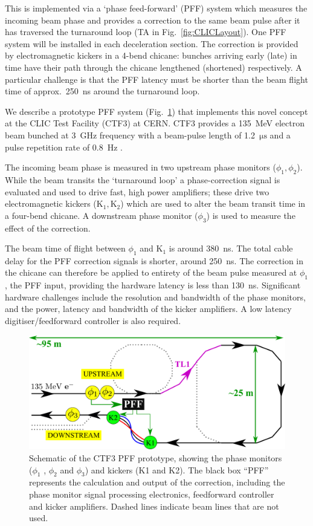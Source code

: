 \documentclass[%
 reprint,
 superscriptaddress,
 amsmath,
 amssymb,
 prl,
]{revtex4-1}
\begin{document}
This is implemented via a `phase feed-forward' (PFF) system which measures the 
incoming beam phase and provides a correction to the same beam pulse 
after it has traversed the turnaround loop (TA in Fig.~\ref{fig:CLICLayout}). 
One PFF system will be installed in each deceleration section. The correction 
is provided by electromagnetic kickers in a 4-bend chicane: bunches arriving 
early (late) in time have their path through the chicane lengthened (shortened) 
respectively. A particular challenge is that the PFF latency must be shorter 
than the beam flight time of approx.~250~ns around the turnaround loop.

We describe a prototype PFF system (Fig.~\ref{fig:pffLayout}) that implements 
this novel concept at the CLIC Test Facility (CTF3) at CERN. CTF3 provides a 
135~MeV electron beam bunched at 3~GHz frequency with a beam-pulse length of 
1.2~\(\mathrm{\mu s}\) and a pulse repetition rate of 0.8~Hz \cite{CLICCDR}. 

The incoming beam phase is measured in two upstream phase 
monitors (\(\phi_{1}, \phi_{2}\)). While the beam 
transits the ‘turnaround loop’ a phase-correction signal is evaluated and used 
to drive fast, high power amplifiers; these drive two electromagnetic kickers 
(\(\mathrm{K_1, K_2}\)) which are used to alter the beam transit time in a 
four-bend chicane. A downstream phase monitor (\(\phi_{3}\)) is 
used to measure the effect of the correction. 

The beam time of flight between \(\phi_1\) and \(\mathrm{K_1}\) is around 
380~ns. The total cable delay for the PFF correction signals 
is shorter, around 250~ns. The correction in the chicane can therefore be 
applied to entirety of the beam pulse measured at \(\phi_1\), the PFF input, 
providing the hardware latency is less than 130~ns. Significant hardware 
challenges include the resolution and bandwidth of the phase monitors, and the 
power, latency and bandwidth of the kicker amplifiers. A low latency 
digitiser/feedforward controller is also required.
 
\begin{figure}
	\includegraphics[width=\columnwidth]{figs/ctfpffLayout}%
	\caption{\label{fig:pffLayout}Schematic of the CTF3 PFF prototype, 
	showing the phase monitors (\(\phi_1\) , 
	\(\phi_2\) and \(\phi_3\)) and kickers (K1 and K2). The black box “PFF” 
	represents the calculation and output of the correction, including the 
	phase monitor signal processing electronics, feedforward controller and 
	kicker amplifiers. Dashed lines indicate beam lines that are not used. 
		}
\end{figure}
\end{document}
